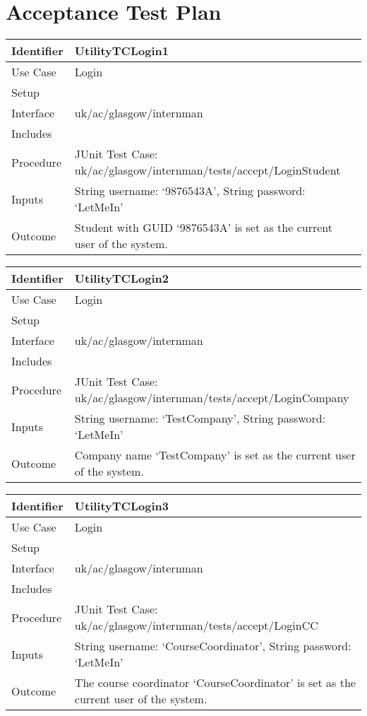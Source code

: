 \section{Acceptance Test Plan}

\begin{tabularx}{\textwidth}{|T|L|}
\hline
Identifier & UtilityTCLogin1\\
\hline
Use Case & Login\\
\hline
Setup &\\
\hline
Interface & uk/ac/glasgow/internman\\
\hline
Includes &\\
\hline
Procedure & JUnit Test Case: uk/ac/glasgow/internman/tests/accept/LoginStudent\\
\hline
Inputs & String username: `9876543A', String password: `LetMeIn'\\
\hline
Outcome & Student with GUID `9876543A' is set as the current user of the system.
\\
\hline
\end{tabularx}

\vspace{2em}

\begin{tabularx}{\textwidth}{|T|L|}
\hline
Identifier & UtilityTCLogin2\\
\hline
Use Case & Login\\
\hline
Setup &\\
\hline
Interface & uk/ac/glasgow/internman\\
\hline
Includes &\\
\hline
Procedure & JUnit Test Case: uk/ac/glasgow/internman/tests/accept/LoginCompany\\
\hline
Inputs & String username: `TestCompany', String password: `LetMeIn'\\
\hline
Outcome & Company name `TestCompany' is set as the current user of the system.\\
\hline
\end{tabularx}

\vspace{2em}

\begin{tabularx}{\textwidth}{|T|L|}
\hline
Identifier & UtilityTCLogin3\\
\hline
Use Case & Login\\
\hline
Setup &\\
\hline
Interface & uk/ac/glasgow/internman\\
\hline
Includes &\\
\hline
Procedure & JUnit Test Case: uk/ac/glasgow/internman/tests/accept/LoginCC\\
\hline
Inputs & String username: `CourseCoordinator', String password: `LetMeIn'\\
\hline
Outcome & The course coordinator `CourseCoordinator' is set as the current user 
of the system.\\
\hline
\end{tabularx}

